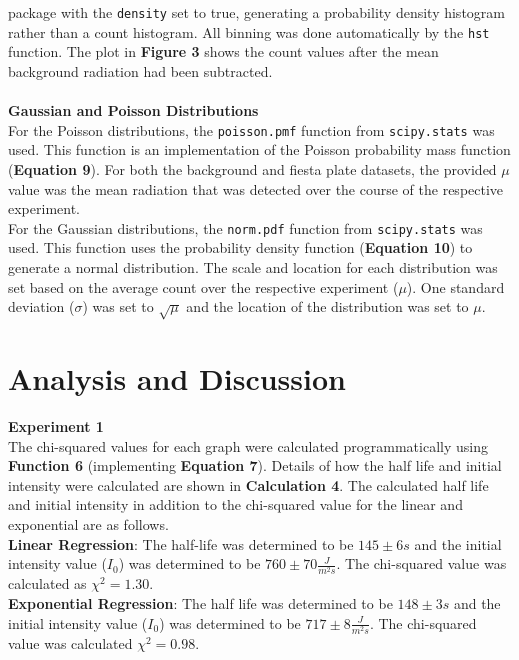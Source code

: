 \documentclass[
	letterpaper, %
	10pt, %
]{CSUniSchoolLabReport}
\begin{document}
package with the \lstinline{density} set to true, generating a probability density histogram rather than a count
histogram. All binning was done automatically by the \lstinline{hst} function. The plot in \textbf{Figure 3} shows the count
values after the mean background radiation had been subtracted.\\\\
{\large\textbf{Gaussian and Poisson Distributions}}\\
For the Poisson distributions, the \lstinline{poisson.pmf} function from \lstinline{scipy.stats} was used. This function is an implementation of the Poisson probability mass function (\textbf{Equation 9}). For both the background and fiesta plate datasets, the provided $\mu$ value was the mean radiation that was detected over the course of the respective experiment.\\

For the Gaussian distributions, the \lstinline{norm.pdf} function from \lstinline{scipy.stats} was used. This function uses the probability density function (\textbf{Equation 10}) to generate a normal distribution. The scale and location for each distribution was set based on the average count over the respective experiment ($\mu$). One standard deviation ($\sigma$) was set to $\sqrt\mu$ and the location of the distribution was set to $\mu$.
\newpage
\section{Analysis and Discussion}
{\Large\textbf{Experiment 1}}\\

The chi-squared values for each graph were calculated programmatically using \textbf{Function 6} (implementing
\textbf{Equation 7}). Details of how the half life and initial intensity were calculated are shown in \textbf{Calculation 4}.
The calculated half life and initial intensity in addition to the chi-squared value for the linear and exponential are as follows.\\

\textbf{Linear Regression}: The half-life was determined to be $145 \pm 6s$ and the initial intensity value ($I_0$) was
determined to be $760\pm70\frac{J}{m^2 s}$. The chi-squared value was calculated as $\chi^2 = 1.30$.\\

\textbf{Exponential Regression}: The half life was determined to be $148 \pm 3s$ and the initial intensity value ($I_0$) was
determined to be $717\pm8\frac{J}{m^2s}$. The chi-squared value was calculated $\chi^2 = 0.98$.\\
\end{document}
